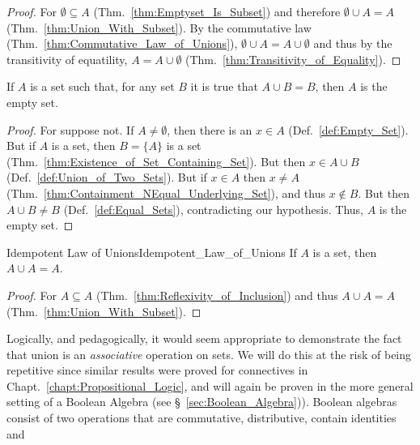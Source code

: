         \begin{proof}
            For $\emptyset\subseteq{A}$ (Thm.~\ref{thm:Emptyset_Is_Subset}) and
            therefore $\emptyset\cup{A}=A$ (Thm.~\ref{thm:Union_With_Subset}).
            By the commutative law (Thm.~\ref{thm:Commutative_Law_of_Unions}),
            $\emptyset\cup{A}=A\cup\emptyset$ and thus by the transitivity of
            equatility, $A=A\cup\emptyset$
            (Thm.~\ref{thm:Transitivity_of_Equality}).
        \end{proof}
        \begin{theorem}
            \label{thm:Empty_Set_Is_Zero_for_Unions}%
            If $A$ is a set such that, for any set $B$ it is true that
            $A\cup{B}=B$, then $A$ is the empty set.
        \end{theorem}
        \begin{proof}
            For suppose not. If $A\ne\emptyset$, then there is an $x\in{A}$
            (Def.~\ref{def:Empty_Set}). But if $A$ is a set, then $B=\{A\}$ is a
            set (Thm.~\ref{thm:Existence_of_Set_Containing_Set}). But then
            $x\in{A}\cup{B}$ (Def.~\ref{def:Union_of_Two_Sets}). But if
            $x\in{A}$ then $x\ne{A}$
            (Thm.~\ref{thm:Containment_NEqual_Underlying_Set}), and thus
            $x\notin{B}$. But then $A\cup{B}\ne{B}$ (Def.~\ref{def:Equal_Sets}),
            contradicting our hypothesis. Thus, $A$ is the empty set.
        \end{proof}
        \begin{ltheorem}{Idempotent Law of Unions}{Idempotent_Law_of_Unions}
            If $A$ is a set, then $A\cup{A}=A$.
        \end{ltheorem}
        \begin{proof}
            For $A\subseteq{A}$ (Thm.~\ref{thm:Reflexivity_of_Inclusion}) and
            thus $A\cup{A}=A$ (Thm.~\ref{thm:Union_With_Subset}).
        \end{proof}
        Logically, and pedagogically, it would seem appropriate to demonstrate
        the fact that union is an \textit{associative} operation on sets. We
        will do this at the risk of being repetitive since similar results were
        proved for connectives in Chapt.~\ref{chapt:Propositional_Logic}, and
        will again be proven in the more general setting of a Boolean Algebra
        (see \S~\ref{sec:Boolean_Algebra})). Boolean algebras consist of two
        operations that are commutative, distributive, contain identities and
